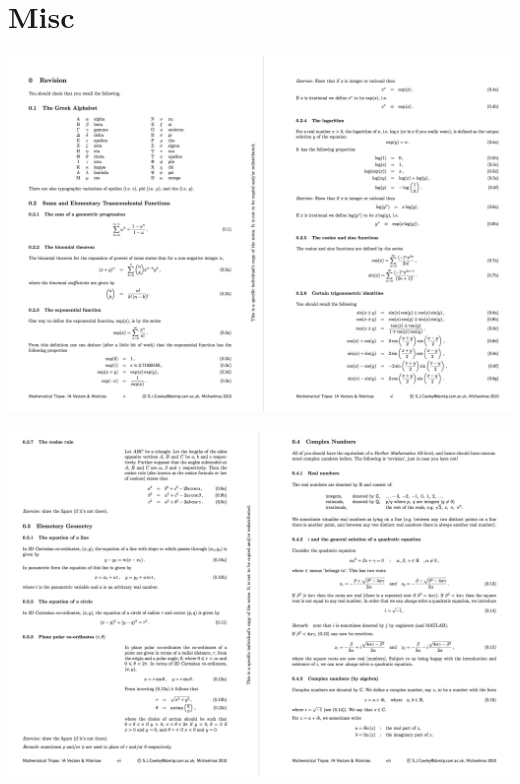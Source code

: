 \section{Misc}
\begin{mdframed}
  \includegraphics[width=400pt]{img/misc--cambridge-1a-vectors-and-matrices-revision-1.png}
\end{mdframed}
\begin{mdframed}
  \includegraphics[width=400pt]{img/misc--cambridge-1a-vectors-and-matrices-revision-2.png}
\end{mdframed}
